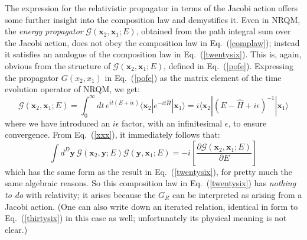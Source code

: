 \documentclass{article}
\def\eq#1{{Eq.~(\ref{#1})}}
\def\b#1{{\bm#1}}
\def\bk#1#2#3{{\langle #1|#2|#3\rangle}}  %
\begin{document}
The expression for the  relativistic propagator in terms of the Jacobi action offers some further insight into the composition law and demystifies it. Even in NRQM, the \textit{energy propagator} $\mathcal{G}(\bm{x}_2,\bm{x}_1;E)$, obtained from the path integral sum over the  Jacobi action, does not obey the composition law in \eq{complaw}; instead it satisfies an analogue of the composition law in 
\eq{twentysix}.
This is, again, obvious from the structure of 
$\mathcal{G}(\bm{x}_2,\bm{x}_1;E)$, defined in \eq{pofe}. Expressing the propagator $G(x_2,x_1)$ in \eq{pofe} as the matrix element of the time evolution operator of NRQM, we get: 
\begin{equation}
 \mathcal{G}(\b x_2, \b x_1;E) = \int_0^\infty dt \, e^{it(E+i\epsilon)}\bk{\b x_2}{e^{-it\hat H}}{\b x_1} 
= i\bk{\b x_2}{(E - \hat H +i\epsilon)^{-1}}{\b x_1}
\label{xxx}
\end{equation} 
where we have introduced an $i\epsilon$ factor, with an infinitesimal $\epsilon$, to ensure convergence.
From  \eq{xxx}, it immediately follows that:
\begin{equation}
 \int d^D\b y \, \mathcal{G}(\b x_2, \b y; E) \mathcal{G}(\b y, \b x_1;E) =  -i\left[\frac{\partial  \mathcal{G}(\b x_2, \b x_1;E)}{\partial E}\right]
\end{equation} 
which has the same form as the result in \eq{twentysix}, for pretty much the same algebraic reasons. So this composition law in \eq{twentysix} has \textit{nothing to do} with relativity; it arises because the $G_R$ can be interpreted as arising from a Jacobi action. (One can also write down an iterated relation, identical in form to \eq{thirtysix} in this case as well; unfortunately its physical meaning is not clear.)
 
\end{document}
